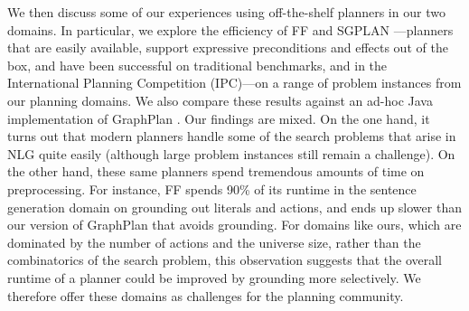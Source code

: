 We then discuss some of our experiences using off-the-shelf planners
in our two domains. In particular, we explore the efficiency of FF
\cite{HoffmannNebel01} and SGPLAN
\cite{hsu06:_new_featur_in_sgplan_for}---planners that are easily
available, support expressive preconditions and effects out of the
box, and have been successful on traditional benchmarks, and in the
International Planning Competition (IPC)---on a range of problem
instances from our planning domains.  We also compare these results
against an ad-hoc Java implementation of GraphPlan \cite{Blum1997}.
Our findings are mixed. On the one hand, it turns out that modern
planners handle some of the search problems that arise in NLG quite
easily (although large problem instances still remain a challenge).
On the other hand, these same planners spend tremendous amounts of
time on preprocessing. For instance, FF spends 90\% of its runtime in
the sentence generation domain on grounding out literals and actions,
and ends up slower than our version of GraphPlan that avoids
grounding. For domains like ours, which are dominated by the number of
actions and the universe size, rather than the combinatorics of the
search problem, this observation suggests that the overall runtime of
a planner could be improved by grounding more selectively. We
therefore offer these domains as challenges for the planning
community.



